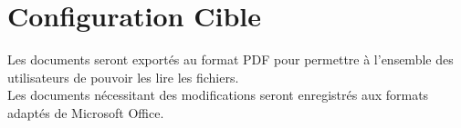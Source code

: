 \section{Configuration Cible}

Les documents seront exportés au format PDF pour permettre à l'ensemble 
des utilisateurs de pouvoir les lire les fichiers. \\

Les documents nécessitant des modifications seront enregistrés aux formats
adaptés de Microsoft Office.


